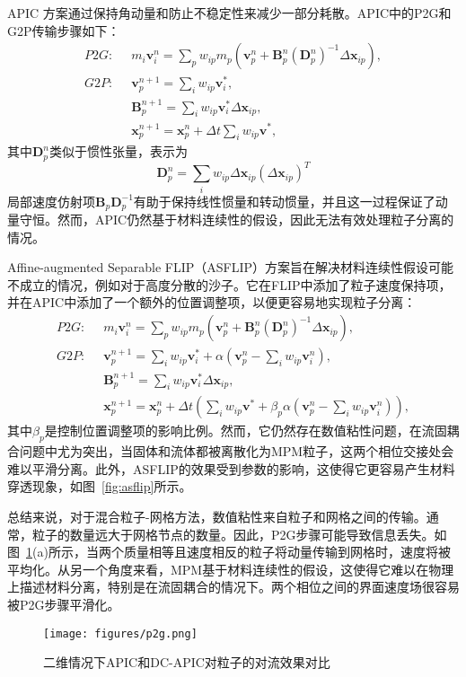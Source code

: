 APIC \cite{jiang2015affine}方案通过保持角动量和防止不稳定性来减少一部分耗散。APIC中的P2G和G2P传输步骤如下：
\begin{equation}
    \begin{aligned}
    P2G: \;\;    
    &m_i\mathbf{v}_i^n =\sum_{p}w_{ip}m_p(\mathbf{v}_p^n + \mathbf{B}_p^n(\mathbf{D}_p^n)^{-1}\Delta\mathbf{x}_{ip}), \\
    G2P:\;\; & \mathbf{v}_p^{n+1}=\sum_iw_{ip}\mathbf{v}_i^*,\\
    &\mathbf{B}_p^{n+1} = \sum_{i}w_{ip}\mathbf{v}_i^*\Delta\mathbf{x}_{ip},\\
    &\mathbf{x}_p^{n+1}=\mathbf{x}_p^n+\Delta t\sum_iw_{ip}\mathbf{v^*},
    \end{aligned}
\end{equation}
其中$\mathbf{D}_p^n$类似于惯性张量，表示为
\begin{equation}
    \mathbf{D}_p^n=\sum_{i}w_{ip}\Delta\mathbf{x}_{ip}(\Delta\mathbf{x}_{ip})^T
\end{equation}
局部速度仿射项$\mathbf{B}_p\mathbf{D}_p^{-1}$有助于保持线性惯量和转动惯量，并且这一过程保证了动量守恒。然而，APIC仍然基于材料连续性的假设，因此无法有效处理粒子分离的情况。

Affine-augmented Separable FLIP（ASFLIP）方案\cite{fei2021revisiting}旨在解决材料连续性假设可能不成立的情况，例如对于高度分散的沙子。它在FLIP中添加了粒子速度保持项，并在APIC中添加了一个额外的位置调整项，以便更容易地实现粒子分离：
\begin{equation}
    \begin{aligned}
    P2G: \;\;    
    &m_i\mathbf{v}_i^n =\sum_{p}w_{ip}m_p(\mathbf{v}_p^n + \mathbf{B}_p^n(\mathbf{D}_p^n)^{-1}\Delta\mathbf{x}_{ip}), \\
    G2P:\;\; & \mathbf{v}_p^{n+1}=\sum_iw_{ip}\mathbf{v}_i^*+ \alpha(\mathbf{v}_p^n-\sum_iw_{ip}\mathbf{v}_i^n),\\
    &\mathbf{B}_p^{n+1} = \sum_{i}w_{ip}\mathbf{v}_i^*\Delta\mathbf{x}_{ip},\\
    &\mathbf{x}_p^{n+1}=\mathbf{x}_p^n+\Delta t(\sum_iw_{ip}\mathbf{v^*}+ \beta_p\alpha(\mathbf{v}_p^n-\sum_iw_{ip}\mathbf{v}_i^n)),
    \end{aligned}
\end{equation}
其中$\beta_p$是控制位置调整项的影响比例。然而，它仍然存在数值粘性问题，在流固耦合问题中尤为突出，当固体和流体都被离散化为MPM粒子，这两个相位交接处会难以平滑分离。此外，ASFLIP的效果受到参数的影响，这使得它更容易产生材料穿透现象，如图~\ref{fig:asflip}所示。

总结来说，对于混合粒子-网格方法，数值粘性来自粒子和网格之间的传输。通常，粒子的数量远大于网格节点的数量。因此，P2G步骤可能导致信息丢失。如图~\ref{fig:p2g}(a)所示，当两个质量相等且速度相反的粒子将动量传输到网格时，速度将被平均化。从另一个角度来看，MPM基于材料连续性的假设，这使得它难以在物理上描述材料分离，特别是在流固耦合的情况下。两个相位之间的界面速度场很容易被P2G步骤平滑化。

\begin{figure}[h]
    \centering
    \texttt{[image: figures/p2g.png]}
    \caption{二维情况下APIC和DC-APIC对粒子的对流效果对比}
    \label{fig:p2g}
\end{figure}
